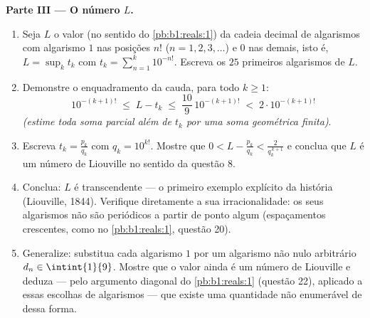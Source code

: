 \begin{problem}
\medskip
\noindent\textbf{Parte III --- O número $L$.}
\begin{enumerate}
  \item Seja $L$ o valor (no sentido do
        \cref{pb:b1:reals:1}) da cadeia decimal de algarismos com
        algarismo $1$ nas posições $n!$ ($n = 1, 2, 3, \dots$)
        e $0$ nas demais, isto é, $L = \sup_k t_k$ com $t_k =
        \sum_{n=1}^{k} 10^{-n!}$. Escreva os $25$ primeiros
        algarismos de $L$.
  \item Demonstre o enquadramento da cauda, para todo $k \geq 1$:
        \[
        10^{-(k+1)!} \;\leq\; L - t_k \;\leq\;
        \frac{10}{9}\,10^{-(k+1)!} \;<\; 2\cdot 10^{-(k+1)!}
        \]
        \emph{(estime toda soma parcial além de $t_k$ por uma soma
        geométrica finita)}.
  \item Escreva $t_k = \frac{p_k}{q_k}$ com $q_k = 10^{k!}$.
        Mostre que $0 < L - \frac{p_k}{q_k} < \frac{2}{q_k^{\,k+1}}$
        e conclua que $L$ é um número de Liouville no sentido
        da questão 8.
  \item Conclua: $L$ é transcendente --- o primeiro exemplo explícito
        da história (Liouville, 1844). Verifique diretamente a sua
        irracionalidade: os seus algarismos não são periódicos a partir
        de ponto algum (espaçamentos crescentes, como no \cref{pb:b1:reals:1},
        questão 20).
  \item Generalize: substitua cada algarismo $1$ por um algarismo
        não nulo arbitrário $d_n \in \intint{1}{9}$. Mostre que o valor ainda é
        um número de Liouville e deduza --- pelo argumento
        diagonal do \cref{pb:b1:reals:1} (questão 22), aplicado
        a essas escolhas de algarismos --- que existe uma quantidade
        não enumerável de  dessa forma.
\end{enumerate}


\end{problem}
